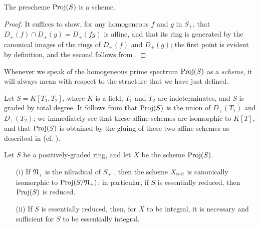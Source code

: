 \begin{proposition}[2.4.2]
\label{II.2.4.2}
The prescheme $\operatorname{Proj}(S)$ is a scheme.
\end{proposition}

\begin{proof}
It suffices  to show, for any homogeneous $f$ and $g$ in $S_+$, that $D_+(f)\cap D_+(g)=D_+(fg)$ is affine, and that its ring is generated by the canonical images of the rings of $D_+(f)$ and $D_+(g)$;
the first point is evident by definition, and the second follows from .
\end{proof}

Whenever we speak of the homogeneous prime spectrum $\operatorname{Proj}(S)$ as a \emph{scheme}, it will always mean with respect to the structure that we have just defined.

\begin{example}[2.4.3]
\label{II.2.4.3}
Let $S=K[T_1,T_2]$, where $K$ is a field, $T_1$ and $T_2$ are indeterminates, and $S$ is graded by total degree.
It follows from  that $\operatorname{Proj}(S)$ is the union of $D_+(T_1)$ and $D_+(T_2)$;
we immediately see that these affine schemes are isomorphic to $K[T]$, and that $\operatorname{Proj}(S)$ is obtained by the gluing of these two affine schemes as described in  (cf. ).
\end{example}

\begin{proposition}[2.4.4]
\label{II.2.4.4}
Let $S$ be a positively-graded ring, and let $X$ be the scheme $\operatorname{Proj}(S)$.
\begin{enumerate}
  \item[{\rm(i)}] If $\mathfrak{N}_+$ is the nilradical of $S_+$ , then the scheme $X_{\mathrm{red}}$ is canonically isomorphic to $\operatorname{Proj}(S/\mathfrak{N}_+)$;
    in particular, if $S$ is essentially reduced, then $\operatorname{Proj}(S)$ is reduced.
  \item[{\rm(ii)}] If $S$ is essentially reduced, then, for $X$ to be integral, it is necessary and sufficient for $S$ to be essentially integral.
\end{enumerate}
\end{proposition}

